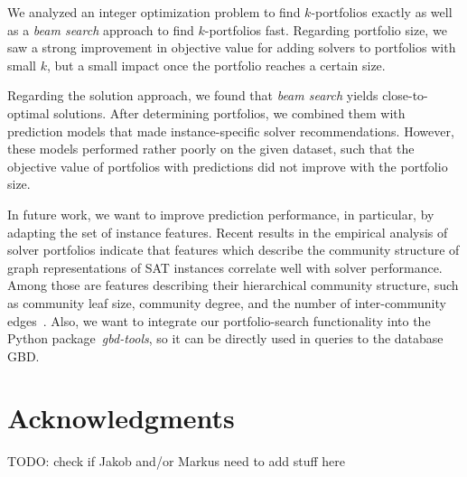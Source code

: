 \documentclass[conference]{IEEEtran}
\newcommand{\todo}[1]{{\color{red}TODO: #1}}
\begin{document}
We analyzed an integer optimization problem to find $k$-portfolios exactly as well as a \emph{beam search} approach to find $k$-portfolios fast.
Regarding portfolio size, we saw a strong improvement in objective value for adding solvers to portfolios with small $k$, but a small impact once the portfolio reaches a certain size.

Regarding the solution approach, we found that \emph{beam search} yields close-to-optimal solutions.
After determining portfolios, we combined them with prediction models that made instance-specific solver recommendations.
However, these models performed rather poorly on the given dataset, such that the objective value of portfolios with predictions did not improve with the portfolio size.

In future work, we want to improve prediction performance, in particular, by adapting the set of instance features.
Recent results in the empirical analysis of solver portfolios indicate that features which describe the community structure of graph representations of SAT instances correlate well with solver performance. 
Among those are features describing their hierarchical community structure, such as community leaf size, community degree, and the number of inter-community edges~\cite{Li:2021:HCS}. 
Also, we want to integrate our portfolio-search functionality into the Python package~\emph{gbd-tools}, so it can be directly used in queries to the database GBD.

\section*{Acknowledgments}

\todo{check if Jakob and/or Markus need to add stuff here}

\balance %



\end{document}
